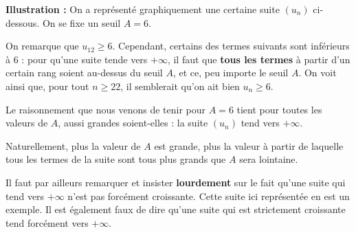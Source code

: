 \documentclass[11pt,fleqn]{book} %
\begin{document}
\textbf{Illustration :} On a représenté graphiquement une certaine suite $(u_n)$ ci-dessous. On se fixe un seuil $A=6$.
\begin{center}

\end{center}

On remarque que $u_{12} \geqslant 6$. Cependant, certains des termes suivants sont inférieurs à 6 : pour qu'une suite tende vers $+\infty$, il faut que \textbf{tous les termes} à partir d'un certain rang soient au-dessus du seuil $A$, et ce, peu importe le seuil $A$.
On voit ainsi que, pour tout $n\geqslant 22$, il semblerait qu'on ait bien $u_n \geqslant 6$.

Le raisonnement que nous venons de tenir pour $A=6$ tient pour toutes les valeurs de $A$, aussi grandes soient-elles : la suite $(u_n)$ tend vers $+\infty$.

Naturellement, plus la valeur de $A$ est grande, plus la valeur à partir de laquelle tous les termes de la suite sont tous plus grands que $A$ sera lointaine.

Il faut par ailleurs remarquer et insister \textbf{lourdement} sur le fait qu'une suite qui tend vers $+\infty$ n'est pas forcément croissante. Cette suite ici représentée en est un exemple. Il est également faux de dire qu'une suite qui est strictement croissante tend forcément vers $+\infty$.

\newpage
\end{document}
